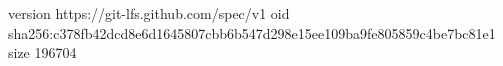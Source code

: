 version https://git-lfs.github.com/spec/v1
oid sha256:c378fb42dcd8e6d1645807cbb6b547d298e15ee109ba9fe805859c4be7bc81e1
size 196704
